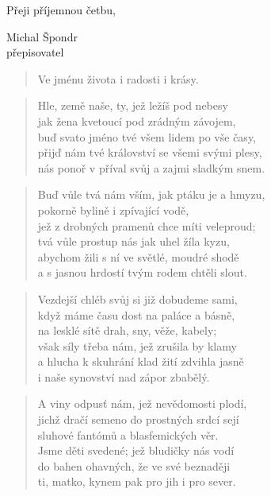 \documentclass{book}
\begin{document}
\bigskip
Přeji příjemnou četbu,
\begin{flushright}
Michal Špondr\\
přepisovatel
\end{flushright}
\newpage
\tableofcontents
\newpage
\markboth{}{}
\begin{verse}
Ve jménu života i radosti i krásy.
\end{verse}
\begin{verse}
Hle, země naše, ty, jež ležíš pod nebesy\\
jak žena kvetoucí pod zrádným závojem,\\
buď svato jméno tvé všem lidem po vše časy,\\
přijď nám tvé království se všemi svými plesy,\\
nás ponoř v příval svůj a zajmi sladkým snem.
\end{verse}
\begin{verse}
Buď vůle tvá nám vším, jak ptáku je a hmyzu,\\
pokorně bylině i zpívající vodě,\\
jež z drobných pramenů chce míti veleproud;\\
tvá vůle prostup nás jak uhel žíla kyzu,\\
abychom žili s ní ve světlé, moudré shodě\\
a s jasnou hrdostí tvým rodem chtěli slout.
\end{verse}
\begin{verse}
Vezdejší chléb svůj si již dobudeme sami,\\
když máme času dost na paláce a básně,\\
na lesklé sítě drah, sny, věže, kabely;\\
však síly třeba nám, jež zrušila by klamy\\
a hlucha k skuhrání klad žití zdvihla jasně\\
i naše synovství nad zápor zbabělý.
\end{verse}
\begin{verse}
A viny odpusť nám, jež nevědomosti plodí,\\
jichž dračí semeno do prostných srdcí sejí\\
sluhové fantómů a blasfemických věr.\\
Jsme děti svedené; jež bludičky nás vodí\\
do bahen ohavných, že ve své beznaději\\
ti, matko, kynem pak pro jih i pro sever.
\end{verse}
\end{document}
